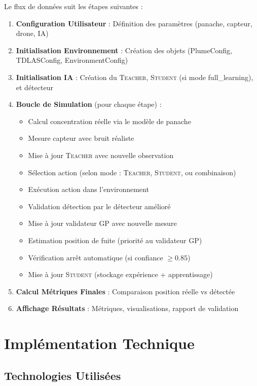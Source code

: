 \documentclass[12pt,a4paper]{article}
\newcommand{\teacher}{\textsc{Teacher}}
\newcommand{\student}{\textsc{Student}}
\newcommand{\gp}{\textsc{GP}}
\begin{document}
Le flux de données suit les étapes suivantes :

\begin{enumerate}
    \item \textbf{Configuration Utilisateur} : Définition des paramètres (panache, capteur, drone, IA)
    \item \textbf{Initialisation Environnement} : Création des objets (PlumeConfig, TDLASConfig, EnvironmentConfig)
    \item \textbf{Initialisation IA} : Création du \teacher{}, \student{} (si mode full\_learning), et détecteur
    \item \textbf{Boucle de Simulation} (pour chaque étape) :
    \begin{itemize}
        \item Calcul concentration réelle via le modèle de panache
        \item Mesure capteur avec bruit réaliste
        \item Mise à jour \teacher{} avec nouvelle observation
        \item Sélection action (selon mode : \teacher{}, \student{}, ou combinaison)
        \item Exécution action dans l'environnement
        \item Validation détection par le détecteur amélioré
        \item Mise à jour validateur \gp{} avec nouvelle mesure
        \item Estimation position de fuite (priorité au validateur \gp{})
        \item Vérification arrêt automatique (si confiance $\geq 0.85$)
        \item Mise à jour \student{} (stockage expérience + apprentissage)
    \end{itemize}
    \item \textbf{Calcul Métriques Finales} : Comparaison position réelle vs détectée
    \item \textbf{Affichage Résultats} : Métriques, visualisations, rapport de validation
\end{enumerate}

\section{Implémentation Technique}

\subsection{Technologies Utilisées}
\end{document}
